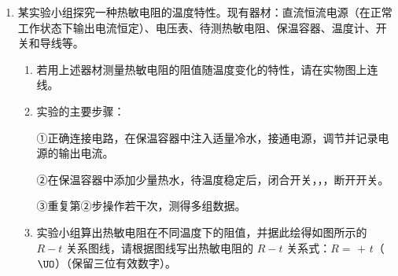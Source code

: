 \documentclass[\gkver]{gaokaozhenti}
\begin{document}
\begin{enumerate}


\item
某实验小组探究一种热敏电阻的温度特性。现有器材：直流恒流电源（在正常工作状态下输出电流恒定）、电压表、待测热敏电阻、保温容器、温度计、开关和导线等。

\begin{enumerate}
	\item
	若用上述器材测量热敏电阻的阻值随温度变化的特性，请在实物图上连线。


	\item
	实验的主要步骤：

	①正确连接电路，在保温容器中注入适量冷水，接通电源，调节并记录电源的输出电流。

	②在保温容器中添加少量热水，待温度稳定后，闭合开关，，，断开开关。

	③重复第②步操作若干次，测得多组数据。

	\item
	实验小组算出热敏电阻在不同温度下的阻值，并据此绘得如图所示的 $R-t$ 关系图线，请根据图线写出热敏电阻的 $R-t$ 关系式：$R=$  $+$  $t$（$\UO$）（保留三位有效数字）。

\end{enumerate}

\end{enumerate}
\end{document}
